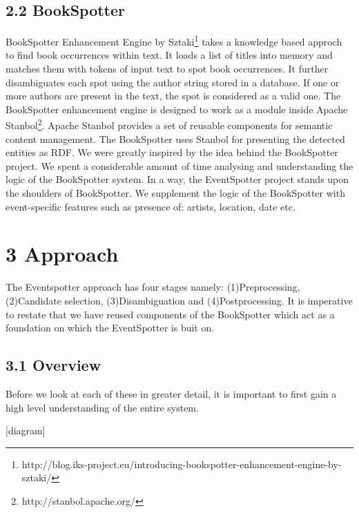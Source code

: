 \documentclass[a4paper,11pt]{report}
\begin{document}
\section*{2.2 BookSpotter}

BookSpotter Enhancement Engine by Sztaki\footnote{http://blog.iks-project.eu/introducing-bookspotter-enhancement-engine-by-sztaki/} takes a knowledge based approch to find book occurrences within text. It loads a list of titles into memory and matches them with tokens of input text to spot book occurrences. It further disambiguates each spot using the author string stored in a database. If one or more authors are present in the text, the spot is considered as a valid one. The BookSpotter enhancement engine is designed to work as a module inside Apache Stanbol\footnote{http://stanbol.apache.org/}. Apache Stanbol provides a set of reusable components for semantic content management. The BookSpotter uses Stanbol for presenting the detected entities as RDF. We were greatly inspired by the idea behind the BookSpotter project. We spent a considerable amount of time analysing and understanding the logic of the BookSpotter system. In a way, the EventSpotter project stands upon the shoulders of BookSpotter. We supplement the logic of the BookSpotter with event-specific features such as presence of: artists, location, date etc.



\chapter*{3 Approach}
The Eventspotter approach has four stages namely: (1)Preprocessing, (2)Candidate selection, (3)Disambiguation and (4)Postprocessing. It is imperative to restate that we have reused components of the BookSpotter which act as a foundation on which the EventSpotter is buit on.

\section*{3.1 Overview}
Before we look at each of these in greater detail, it is important to first gain a high level understanding of the entire system.

[diagram]


\end{document}
